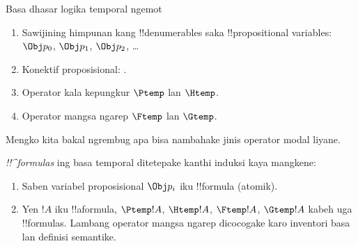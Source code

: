 \documentclass[../../../include/open-logic-section]{subfiles}
\begin{document}


\begin{defn}
Basa dhasar logika temporal ngemot
\begin{enumerate}
  \item Sawijining himpunan kang !!{denumerable}s saka !!{propositional variable}s: $\Obj
    p_0$, $\Obj p_1$, $\Obj p_2$, \dots
  \item Konektif proposisional: \startycommalist
  .
  \item Operator kala kepungkur $\Ptemp$ lan $\Htemp$.
  \item Operator mangsa ngarep $\Ftemp$ lan $\Gtemp$.
\end{enumerate}
\end{defn}

Mengko kita bakal ngrembug apa bisa nambahake jinis operator modal liyane.

\begin{defn}
\emph{!!^{formula}s} ing basa temporal ditetepake kanthi induksi
  kaya mangkene:
\begin{enumerate}


\item Saben variabel proposisional $\Obj p_i$ iku !!{formula} (atomik).






\item Yen $!A$ iku !!a{formula}, $\Ptemp  !A$, $\Htemp  !A$, $\Ftemp !A$, $\Gtemp  !A$
  kabeh uga !!{formula}s.
Lambang operator mangsa ngarep dicocogake karo inventori basa lan definisi semantike.

\end{enumerate}
\end{defn}
\end{document}
